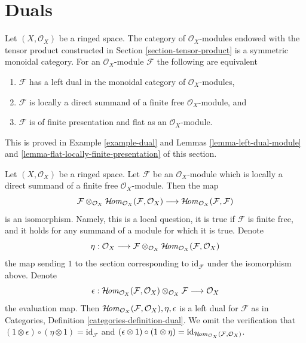 \section{Duals}
\label{section-duals}

\noindent
Let $(X, \mathcal{O}_X)$ be a ringed space. The category of
$\mathcal{O}_X$-modules endowed with the tensor product
constructed in Section \ref{section-tensor-product}
is a symmetric monoidal category. For an $\mathcal{O}_X$-module
$\mathcal{F}$ the following are equivalent
\begin{enumerate}
\item $\mathcal{F}$ has a left dual in the monoidal category
of $\mathcal{O}_X$-modules,
\item $\mathcal{F}$ is locally a direct summand of a finite
free $\mathcal{O}_X$-module, and
\item $\mathcal{F}$ is of finite presentation and flat as an
$\mathcal{O}_X$-module.
\end{enumerate}
This is proved in Example \ref{example-dual} and
Lemmas \ref{lemma-left-dual-module} and
\ref{lemma-flat-locally-finite-presentation} of this section.

\begin{example}
\label{example-dual}
Let $(X, \mathcal{O}_X)$ be a ringed space. Let $\mathcal{F}$
be an $\mathcal{O}_X$-module which is locally a direct summand of a finite
free $\mathcal{O}_X$-module. Then the map
$$
\mathcal{F} \otimes_{\mathcal{O}_X}
\mathop{\mathcal{H}\!\mathit{om}}\nolimits_{\mathcal{O}_X}(\mathcal{F}, \mathcal{O}_X)
\longrightarrow
\mathop{\mathcal{H}\!\mathit{om}}\nolimits_{\mathcal{O}_X}(\mathcal{F}, \mathcal{F})
$$
is an isomorphism. Namely, this is a local question, it is true
if $\mathcal{F}$ is finite free, and it holds for any summand
of a module for which it is true. Denote
$$
\eta :
\mathcal{O}_X
\longrightarrow
\mathcal{F} \otimes_{\mathcal{O}_X}
\mathop{\mathcal{H}\!\mathit{om}}\nolimits_{\mathcal{O}_X}(\mathcal{F}, \mathcal{O}_X)
$$
the map sending $1$ to the section corresponding to
$\text{id}_\mathcal{F}$ under the isomorphism above.
Denote
$$
\epsilon : 
\mathop{\mathcal{H}\!\mathit{om}}\nolimits_{\mathcal{O}_X}(\mathcal{F}, \mathcal{O}_X)
\otimes_{\mathcal{O}_X} \mathcal{F}
\longrightarrow
\mathcal{O}_X
$$
the evaluation map. Then
$\mathop{\mathcal{H}\!\mathit{om}}\nolimits_{\mathcal{O}_X}(\mathcal{F}, \mathcal{O}_X), \eta, \epsilon$
is a left dual for $\mathcal{F}$ as in
Categories, Definition \ref{categories-definition-dual}.
We omit the verification that
$(1 \otimes \epsilon) \circ (\eta \otimes 1) = \text{id}_\mathcal{F}$
and
$(\epsilon \otimes 1) \circ (1 \otimes \eta) =
\text{id}_{\mathop{\mathcal{H}\!\mathit{om}}\nolimits_{\mathcal{O}_X}(\mathcal{F}, \mathcal{O}_X)}$.
\end{example}

